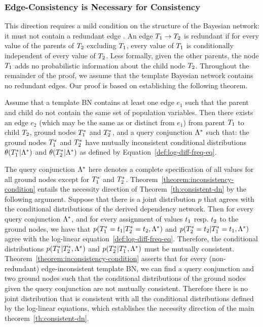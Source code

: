 \documentclass[runningheads,a4paper]{llncs}
\begin{document}
\subsubsection{Edge-Consistency is Necessary for Consistency} 
This direction requires a mild condition on the structure of the Bayesian network: it must not contain a redundant edge \cite{Pearl1988}. An edge $T_{1}\rightarrow T_{2}$ is redundant if for every value of the parents of $T_{2}$ excluding $T_{1}$, every value of $T_{1}$ is conditionally independent of every value of $T_{2}$. Less formally, given the other parents, the node $T_{1}$ adds no probabilistic information about the child node $T_{2}$. Throughout the remainder of the proof, we assume that the template Bayesian network contains no redundant edges.
Our proof is based on establishing the following theorem. 

\begin{theorem}\label{theorem:inconsistency-condition}
Assume that a template BN contains at least one edge $e_1$ such that the parent and child do not contain the same set of population variables. Then there exists an edge $e_2$ (which may be the same as or distinct from $e_1$) from parent $T_{1}$ to child $T_{2}$, ground nodes $T_{1}^{*}\hspace{0.0ex}$ and $T_{2}^{*}\hspace{0.0ex}$,  and a query conjunction $\Lambda^{*}\hspace{0.0ex}$ such that: the ground nodes $T_{1}^{*}\hspace{0.0ex}$ and $T_{2}^{*}\hspace{0.0ex}$ have mutually inconsistent conditional distributions $\theta(T_{1}^{*}\hspace{0.0ex}|\Lambda^{*}\hspace{0.0ex})$ and $\theta(T_{2}^{*}\hspace{0.0ex}|\Lambda^{*}\hspace{0.0ex})$ as defined by Equation~\ref{def:log-diff-freq-eq}.
\end{theorem}

The query conjunction $\Lambda^{*}\hspace{0.0ex}$ here denotes a complete specification of all values for all ground nodes except for $T_{1}^{*}\hspace{0.0ex}$ and $T_{2}^{*}\hspace{0.0ex}$. Theorem~\ref{theorem:inconsistency-condition} entails the necessity direction of Theorem~\ref{th:consistent-dn} by the following argument. Suppose that there is a joint distribution $p$ that agrees with the conditional distributions of the derived dependency network. Then for every query conjunction $\Lambda^{*}\hspace{0.0ex}$, and for every assignment of values $t_{1}$ resp. $t_{2}$ to the ground nodes, we  have that $p(T_{1}^{*}\hspace{0.0ex}=t_{1}|T_{2}^{*}\hspace{0.0ex}=t_{2},\Lambda^{*}\hspace{0.0ex})$ and $p(T_{2}^{*}\hspace{0.0ex}=t_{2}|T_{1}^{*}\hspace{0.0ex}=t_{1},\Lambda^{*}\hspace{0.0ex})$ agree with the log-linear equation~\ref{def:log-diff-freq-eq}. Therefore, the conditional distributions $p(T_{1}^{*}\hspace{0.0ex}|T_{2}^{*}\hspace{0.0ex},\Lambda^{*}\hspace{0.0ex})$ and $p(T_{2}^{*}\hspace{0.0ex}|T_{1}^{*}\hspace{0.0ex},\Lambda^{*}\hspace{0.0ex})$ must be mutually consistent. 
Theorem~\ref{theorem:inconsistency-condition} asserts that for every (non-redundant) edge-inconsistent template BN, we can find a query conjunction and two ground nodes such that the conditional distributions of the ground nodes given the query conjunction are not mutually consistent. Therefore there is no joint distribution that is consistent with all the conditional distributions defined by the log-linear equations, which establishes the necessity direction of the main theorem~\ref{th:consistent-dn}. 
\end{document}
